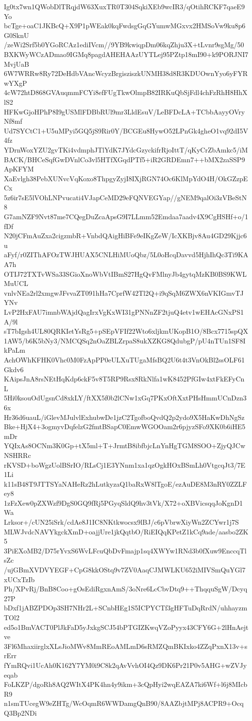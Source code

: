Ig0tx7wn1QWobDlTRqjdW63XuxTR0T304SqkiXEb9wcIR3/qOtihRCKF7qaeE9Yo
bcTge+oaC1JKBcQ+X9P1pWEak0kqFwdsgGqGYumwMGxvx2HMSoVw9ku8p6G0SknU
/zeWi2Srf5b0YGoRCAz1ediIVcm//9YB9kwiqpDm06kqZhju3X+tLvnr9sgMg/50
BXKWyWCzADmao9IGMq8pagdAHEHAAzUYTLej95PZtp18mI90+k9PORJNI7MvjUaB
6W7WRRw8Ry72DeHdbVAncWcyzBrgisziszkUNMH38d8R3KDUOwnYyo6yFYRwYXgP
4cW72htD868GVAuqmmFCYi8efFUgTkwOlmpB82IRKuQbSjFdl4chFzRhH8HhXlS2
HFKwGjoHPhP8I9gUSMlFDBbRUl9mr3LldEsuV/LeBFDcLA+TCbbAayyOVryNf8mf
Ud7SYCtC1+U5uMPyi5GQ5jS9Rir0Y/BCGEu8HywO52LPnGk4gheO1vq92dI5V4fz
YDrnWoxYZU2gvTKi4vdmphJTlYdK7JYdcGzyckifrRjoIttT/qKyCrZbAmkc5/iM
BACK/BHCeSqfGwDVnlCo3vl5HTfXGqdPTf5+iR2GRDEmn7++bMX2zaSSP9ApKFYM
XaEvlgh38PebXUNvcVqKoxo8ThpgyZyjI8IXjRGN74Oc6KlMpYdO4H/OkGZzpECx
5z6ir7sE5lVOhLNPvucati4VJapCeMD29eFQNVEGYap//gNEM9qalOi3zVBeStN8
G7amNZF9Nvt87me7CQegDuZcaApsG9I7LLmm52Emdaa7aadv4X9CgHSHf+o/1fDf
N20jCFmAuZxa2cigzmbR+VnbdQAigHiBFe9eIKgZeW/IcXKBjv8Au4GD29Kjjc6u
aFyf/r0ZIThAFOzTWJHUAX5CNLHiMUoQbz/5L0oHcqDavvd5HjhIhQc3Ti9KAA7h
OTIJ72TXTvWSa33SGioXnoWbVtIBmS27HgQvFMlnyJb4gytqMzKB0BS9KWLMuUCL
vnlvNEa2rl2xmgwJFvvaZT091hHa7CprfW42Tl2Q+i9qSqM6ZWX6nVKIGmvTJYNv
LvP2HxFAU7imnbWAjdQagIrxVgKxWI31gPNNnZF2tjuQ4etv1wEHAcGNxPS1A/9l
sT7bIgsh4UL80QRKIetYsRg5+pSEpVFIf22Wto6xljkmUKopB1O/8Bcx7715spQX
1AW5/b6K5bNy3/NMCQSq2nOaZBLZrpaS8ukXZKG8QdubgP/pU4nTUn1SF8IkPaLm
AchOWhKFHK0Vhc0M0FzApPP0eULXuTUgaMfsBQ2U6t4t3VnOkBl2ssOLF61Gkdv6
KAipsJnA8rsNEtHqKdp6ckF5v8T5RP9Rsx8RkNlfa1wK8452PfGIw4xtFkEFyCnL
5Hi0ksouOdUgsnCd8xkLY/ftXX5f0b2lCNw1xGq7PKxOftXxtPHsHmmUCnDzn36x
Hr36d6uauL/iGlevMJulvlExhubwDe1jzC2TgofboQvdQ2p2ydo9X5HaKwDhNgSz
Bke+HjX4+3ogmyvDqfelzG2fmtBSapC0EmwWGOOam2r6pjyzSFo9XK0b6iHE5mDr
YQIxAs8OCNm3K0Gp+tX5ml+T+JrmtB8ibfbjcLnYnHgTGM8SOO+ZjyQJCwNSHRRc
rKVSD+boWgzUolBSrIO/RLsCj1E3YNnm1xa1qzOgkHOxBSmLh0VtgcqJt3/7E1Li
k11sB48T9JTTSYaNAHeRz2hLutkyzaQ1baRxW8lTgoE/ezAuDE8M3nRY0ZZLFey8
1zFzXew0pZXWzf9DgS0GQ9fRj5PGyqSldQ9hv3tVk/X72+oXBVicsqqJoKgnD1Wa
Lrksor+/cUN25iSrk/cdAe8J1IC8NKtkwocsx9lBJ/c6pVbrwXiyWn2ZCYwr1j7S
MLWJvdcNAVYkgckXmD+oajjUre1jkQqtbO/RiEIQqKPetZ1kCq9ade/aasbo2ZK5
3PiEXoMB2/D75rYvxS6WvLFcuQbDvFmajp1sq4XWYw1RNd3b0fXuw9EnccqTlsZc
/ujGBmXVDVYEGF+CpG8kkOStq9v7ZV0AaqCJMWLKU652iMIVSmQuYGl7xUCxTzIb
Ph/XPvRj/BnB8Coo+gOsEdiRgxnAmS/3oNre6LcCbvDtq9++ThqquSgW/Dcyq27P
bDxf1jABZPDOp3SH7NHr2L+SCnbHEg1S5ICPYCTf3gHFTuDqRrdN/uhhayzmTOl2
ed5o1BmVACT0PlJkFaD5yJxkgSCJ54bPTGIZKwqVZoPyyx43CFY6G+2lHnAejtve
3Fl6MhaxiirglxXLsJioMWv8MmREoAMLmD6sRMZQmBKIxko4ZZqPxnX13v+srErr
fYmRQvi1UcAh0K162Y7YM0i9C8k2qAvVvhOI4Qz9DK6Pr21P0v5AHG+wZVJyeqab
FoLKZP/dgoRh8AQ2WItX4PK4hn4y9ikm+3cQpHyi2wqEAZA7ki6Wf+l6j8MIcbR9
n1smTUcegW9eZHTg/WcOqmR6WWDamgQnB90/8AAZbjtMPj8ACPR9+OcqQ3Bp2NDi
